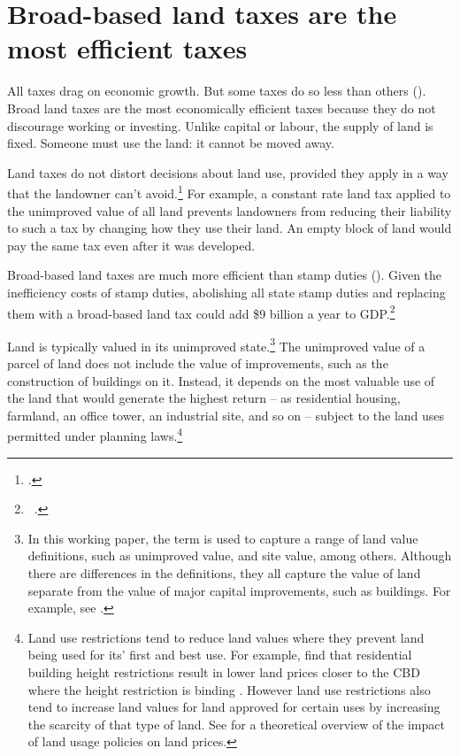 \section{Broad-based land taxes are the most efficient taxes}
All taxes drag on economic growth. But some taxes do so less than others (). Broad land taxes are the most economically efficient taxes because they do not discourage working or investing. Unlike capital or labour, the supply of land is fixed. Someone must use the land: it cannot be moved away. 


Land taxes do not distort decisions about land use, provided they apply in a way that the landowner can’t avoid.\footcite[][247]{HenryTaxReview2010}  For example, a constant rate land tax applied to the unimproved value of all land prevents landowners from reducing their liability to such a tax by changing how they use their land. An empty block of land would pay the same tax even after it was developed. 

Broad-based land taxes are much more efficient than stamp duties (). Given the inefficiency costs of stamp duties, abolishing all state stamp duties and replacing them with a broad-based land tax could add \$9 billion a year to GDP.\footnote{\gao\ \textcites{KPMGEconotech2011-GST}{ABS2015h}.}

Land is typically valued in its unimproved state.\footnote{In this working paper, the term  is used to capture a range of land value definitions, such as unimproved value, and site value, among others. Although there are differences in the definitions, they all capture the value of land separate from the value of major capital improvements, such as buildings. For example, see \textcite[][153]{HefferanBoyd2010}.}  The unimproved value of a parcel of land does not include the value of improvements, such as the construction of buildings on it. Instead, it depends on the most valuable use of the land that would generate the highest return – as residential housing, farmland, an office tower, an industrial site, and so on – subject to the land uses permitted under planning laws.\footnote{Land use restrictions tend to reduce land values where they prevent land being used for its’ first and best use. For example, \textcite{KulishRichardsGillitzer2011} find that residential building height restrictions result in lower land prices closer to the CBD where the height restriction is binding \textcite[][11]{KulishRichardsGillitzer2011}. However land use restrictions also tend to increase land values for land approved for certain uses by increasing the scarcity of that type of land. See \textcite{Brueckner2007} for a theoretical overview of the impact of land usage policies on land prices.}

